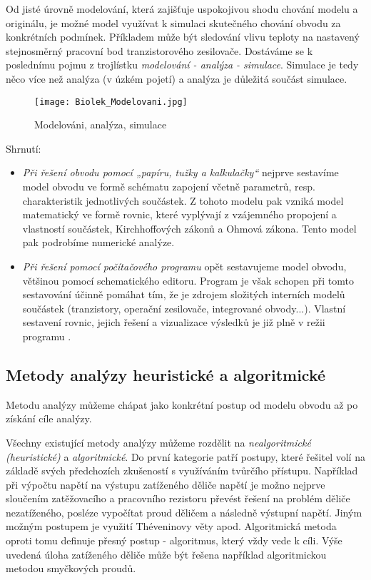       Od jisté úrovně modelování, která zajišťuje uspokojivou shodu chování modelu a originálu, je 
      možné model využívat k simulaci skutečného chování obvodu za konkrétních podmínek. Příkladem 
      může být sledování vlivu teploty na nastavený stejnosměrný pracovní bod tranzistorového 
      zesilovače. Dostáváme se k poslednímu pojmu z trojlístku \emph{modelování - analýza - 
      simulace}. Simulace je tedy něco více než analýza (v úzkém pojetí) a analýza je důležitá 
      součást simulace.
      
      \begin{figure}[ht!]
        \centering
        \texttt{[image: Biolek\_Modelovani.jpg]}
        \caption{Modelováni, analýza, simulace \cite[s.~17]{Biolek2004}}
        \label{TEO:fig_modelovani}
      \end{figure}
      
      Shrnutí:
      \begin{itemize}
        \itemsep0em
        \item \emph{Při řešení obvodu pomocí „papíru, tužky a kalkulačky“} nejprve sestavíme model 
              obvodu ve formě schématu zapojení včetně parametrů, resp. charakteristik jednotlivých 
              součástek. Z tohoto modelu pak vzniká model matematický ve formě rovnic, které 
              vyplývají z vzájemného propojení a vlastností součástek, Kirchhoffových zákonů a 
              Ohmová zákona. Tento model pak podrobíme numerické analýze.      
        \item \emph{Při řešení pomocí počítačového programu} opět sestavujeme model obvodu,  
              většinou pomocí schematického editoru. Program je však schopen při tomto sestavování 
              účinně pomáhat tím, že je zdrojem složitých interních modelů součástek (tranzistory, 
              operační zesilovače, integrované obvody...). Vlastní sestavení rovnic, jejich řešení 
              a vizualizace výsledků je již plně v režii programu \cite[s.~18]{Biolek2004}.
      \end{itemize}
      
    \subsection{Metody analýzy heuristické a algoritmické}
      Metodu analýzy můžeme chápat jako konkrétní postup od modelu obvodu až po získání cíle analýzy.
      
      Všechny existující metody analýzy můžeme rozdělit na \emph{nealgoritmické (heuristické)} a 
      \emph{algoritmické}. Do první kategorie patří postupy, které řešitel volí na základě svých 
      předchozích zkušeností s využíváním tvůrčího přístupu. Například při výpočtu napětí na 
      výstupu zatíženého děliče napětí je možno nejprve sloučením zatěžovacího a pracovního 
      rezistoru převést řešení na problém děliče nezatíženého, posléze vypočítat proud děličem a 
      následně výstupní napětí. Jiným možným postupem je využití Théveninovy věty apod. 
      Algoritmická metoda oproti tomu definuje přesný postup - algoritmus, který vždy vede k cíli. 
      Výše uvedená úloha zatíženého děliče může být řešena například algoritmickou metodou 
      smyčkových proudů.
      
